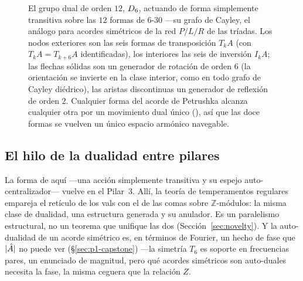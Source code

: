 \begin{figure}[ht]
\centering
{}
\caption{El grupo dual de orden $12$, $D_{6}$, actuando de forma simplemente transitiva sobre las $12$
formas de $6$-$30$ ---su grafo de Cayley, el análogo para acordes simétricos de la red $P/L/R$ de las
tríadas. Los nodos exteriores son las seis formas de transposición $T_kA$ (con $T_kA=T_{k+6}A$
identificadas), los interiores las seis de inversión $I_kA$; las flechas sólidas son un generador de
rotación de orden $6$ (la orientación se invierte en la clase interior, como en todo grafo de Cayley
diédrico), las aristas discontinuas un generador de reflexión de orden $2$. Cualquier forma del acorde de
Petrushka alcanza cualquier otra por un movimiento dual único (), así que las doce
formas se vuelven un único espacio armónico navegable.}
\label{fig:p2-cayley}
\end{figure}

\subsection{El hilo de la dualidad entre pilares}\label{sec:p2-thread}

La forma de aquí ---una acción simplemente transitiva y su espejo auto-centralizador--- vuelve en el
Pilar~3. Allí, la teoría de temperamentos regulares empareja el retículo de los vals con el de las comas
sobre $\mathbb{Z}$-módulos: la misma clase de dualidad, una estructura generada y su anulador.
Es un paralelismo estructural, no un teorema que unifique las dos (Sección~\ref{sec:novelty}). Y la
auto-dualidad de un acorde simétrico es, en términos de Fourier, un hecho de fase que $|\hat{A}|$ no puede
ver (\S\ref{sec:p1-capstone}) ---la simetría $T_6$ es soporte en frecuencias pares, un enunciado de
magnitud, pero qué acordes simétricos son auto-duales necesita la fase, la misma ceguera que la relación
$Z$.

